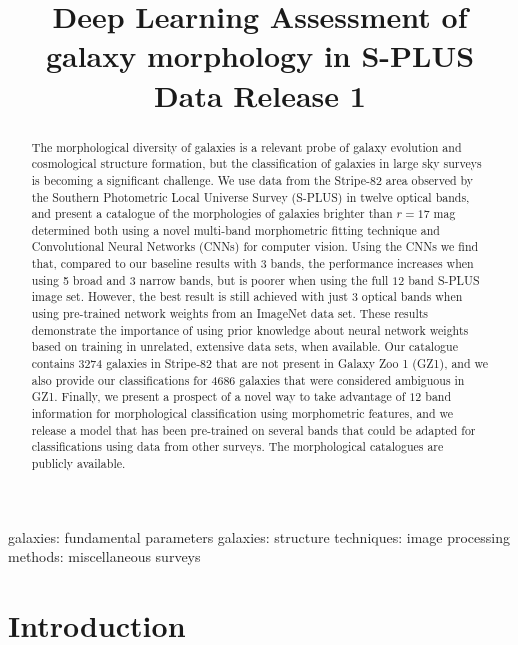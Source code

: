 \documentclass[fleqn,usenatbib]{mnras}
\title[Galaxy morphologies in S-PLUS]{Deep Learning Assessment of galaxy morphology in S-PLUS Data Release 1}
\begin{document}
\maketitle

\begin{abstract}
The morphological diversity of galaxies is a relevant probe of galaxy evolution and cosmological structure formation, but the classification of galaxies in large sky surveys is becoming a significant challenge. We use data from the Stripe-82 area observed by the Southern Photometric Local Universe Survey (S-PLUS) in twelve optical bands, and present a catalogue of the morphologies of galaxies brighter than $r=17$ mag determined both using a novel multi-band morphometric fitting technique and Convolutional Neural Networks (CNNs) for computer vision. Using the CNNs we find that, compared to our baseline results with 3 bands, the performance increases when using 5 broad and 3 narrow bands, but is poorer when using the full $12$ band S-PLUS image set. However, the best result is still achieved with just 3 optical bands when using pre-trained network weights from an ImageNet data set. These results demonstrate the importance of using prior knowledge about neural network weights based on training in unrelated, extensive data sets, when available. Our catalogue contains 3274 galaxies in Stripe-82 that are not present in Galaxy Zoo 1 (GZ1), and we also provide our classifications for 4686 galaxies that were considered ambiguous in GZ1. Finally, we present a prospect of a novel way to take advantage of $12$ band information for morphological classification using morphometric features, and we release a model that has been pre-trained on several bands that could be adapted for classifications using data from other surveys. The morphological catalogues are publicly available.\\
\end{abstract}



\begin{keywords} %
galaxies: fundamental parameters \mysep 
galaxies: structure \mysep 
techniques: image processing \mysep
methods: miscellaneous \mysep
surveys
\end{keywords}





\section{Introduction}
\label{sec:introduction}
\end{document}
